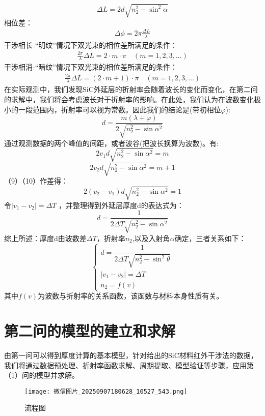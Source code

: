 \documentclass[withoutpreface,bwprint]{cumcmthesis}
\begin{document}
\begin{equation}
\Delta L = 2d \sqrt{n_2^2 - \sin^2 \alpha}
\end{equation}
相位差：
\begin{gather}
	\Delta \phi = 2\pi \frac{\Delta L}{\lambda}
\end{gather}
干涉相长-“明纹”情况下双光束的相位差所满足的条件：
\begin{gather}
	\frac{2\pi}{\lambda}\Delta L = 2\cdot m\cdot \pi  \quad (m=1,2,3,\ldots)
\end{gather}
干涉相消-“暗纹”情况下双光束的相位差所满足的条件：
\begin{gather}
	\frac{2\pi}{\lambda}\Delta L = (2\cdot m + 1 )\cdot \pi \quad (m=1,2,3,\ldots)
\end{gather}
在实际观测中，我们发现SiC外延层的折射率会随着波长的变化而变化，在第二问的求解中，我们将会考虑波长对于折射率的影响。在此处，我们认为在波数变化极小的一段范围内，折射率可以视为常数。因此我们的结论是(带初相位$\varphi$):
\begin{equation}
	d = \frac{m (\lambda + \varphi)  }{2\sqrt{n_2^2 - \sin \alpha^2}}
\end{equation}
通过观测数据的两个峰值的间距，或者波谷(把波长换算为波数)。有:
\begin{equation}
2v_1d\sqrt{n_2^2 - \sin \alpha^2} = m
\end{equation}
\begin{equation}
2v_2d\sqrt{n_2^2 - \sin \alpha^2} = m+1
\end{equation}
（9）（10）作差得：
\begin{equation}
2(v_2-v_1)d\sqrt{n_2^2 - \sin \alpha^2} = 1
\end{equation}
令$
|v_1 - v_2| = \Delta T
$
，并整理得到外延层厚度d的表达式为：\begin{equation}
d = \frac{1}{2 \Delta T \sqrt{n_2^2 - \sin \alpha^2}}
\end{equation}
综上所述：厚度d由波数差$\Delta T$，折射率$n_2$,以及入射角$\alpha$确定，三者关系如下：
\begin{equation}
\begin{cases}
d = \dfrac{1}{2 \Delta T \sqrt{n_2^{2}-\sin^{2}\theta}}\\[4pt]
|v_{1}-v_{2}|=\Delta T\\[4pt]
n_{2}=f(v)
\end{cases}
\label{eq:thickness}
\end{equation}
其中$f(v)$为波数与折射率的关系函数，该函数与材料本身性质有关。
	\section{第二问的模型的建立和求解}
	由第一问可以得到厚度计算的基本模型，针对给出的SiC材料红外干涉法的数据，我们将通过数据预处理、折射率函数求解、周期提取、模型验证等步骤，应用第（1）问的模型并求解。
	\begin{figure}[H]
	\centering
	\texttt{[image: 微信图片\_20250907180628\_10527\_543.png]}
	\caption{流程图}
	\label{流程图}
	\end{figure}
\end{document}
